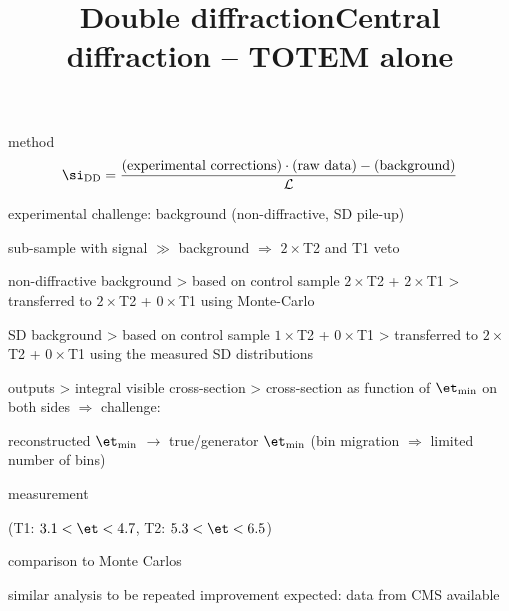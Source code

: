 \vskip-3mm

\> method
$$\si_{\rm DD} = {\hbox{(experimental corrections)}\cdot\hbox{(raw data)} - \hbox{(background)}\over {\cal L}}$$

\> experimental challenge: background (non-diffractive, SD pile-up)


\centerline{\cYe sub-sample with signal $\gg$ background $\Rightarrow$  $2\times$T2 and T1 veto\cFg}


\> non-diffractive background
\>> based on control sample $2\times$T2 + $2\times$T1
\>> transferred to $2\times$T2 + $0\times$T1 using Monte-Carlo

\> SD background
\>> based on control sample $1\times$T2 + $0\times$T1
\>> transferred to $2\times$T2 + $0\times$T1 using the measured SD distributions


\> outputs
\>> integral visible cross-section
\>> cross-section as function of $\et_{\rm min}$ on both sides $\Rightarrow$ challenge:

\centerline{reconstructed $\et_{\rm min}$ $\longrightarrow$ true/generator $\et_{\rm min}$ \hskip5mm (bin migration $\Rightarrow$ limited number of bins)}


\newpage %
\title{Double diffraction}


\noindent{}

\> measurement

\centerline{}

\centerline{(T1: $3.1 < \et < 4.7$, T2: $5.3 < \et < 6.5$)}

\> comparison to Monte Carlos

\centerline{}


\vfil
\noindent{}

{
\> similar analysis to be repeated
\> improvement expected: data from CMS available
}


\newpage %
\hbox{}
\vfil
\title{Central diffraction -- TOTEM alone}

